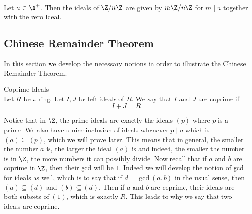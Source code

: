 \documentclass[a4paper]{article}
\begin{document}
\begin{eg}{}{}\\
Let $n\in\N^+$. Then the ideals of $\Z/n\Z$ are given by $m\Z/n\Z$ for $m\;|\;n$ together with the zero ideal. 
\end{eg}

\subsection{Chinese Remainder Theorem}
In this section we develop the necessary notions in order to illustrate the Chinese Remainder Theorem. 

\begin{defn}{Coprime Ideals}{}\\
Let $R$ be a ring. Let $I,J$ be left ideals of $R$. We say that $I$ and $J$ are coprime if $$I+J=R$$
\end{defn}

Notice that in $\Z$, the prime ideals are exactly the ideals $(p)$ where $p$ is a prime. We also have a nice inclusion of ideals whenever $p\;|\;a$ which is $(a)\subseteq(p)$, which we will prove later. This means that in general, the smaller the number $a$ is, the larger the ideal $(a)$ is and indeed, the smaller the number is in $\Z$, the more numbers it can possibly divide. Now recall that if $a$ and $b$ are coprime in $\Z$, then their gcd will be $1$. Indeed we will develop the notion of gcd for ideals as well, which is to say that if $d=\gcd(a,b)$ in the usual sense, then $(a)\subseteq(d)$ and $(b)\subseteq(d)$. Then if $a$ and $b$ are coprime, their ideals are both subsets of $(1)$, which is exactly $R$. This leads to why we say that two ideals are coprime. 
\end{document}
